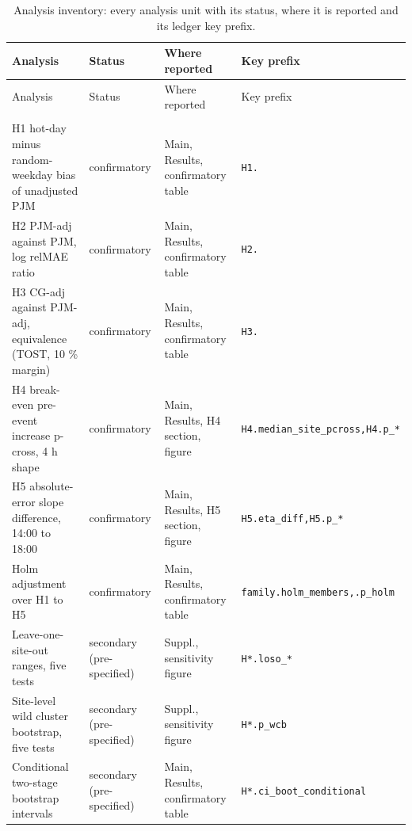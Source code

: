 {\footnotesize
\setlength{\tabcolsep}{3pt}
\renewcommand{\arraystretch}{1.0}
\begin{longtable}{@{}>{\raggedright\arraybackslash}p{}>{\raggedright\arraybackslash}p{}>{\raggedright\arraybackslash}p{}>{\raggedright\arraybackslash}p{}@{}}
\caption{Analysis inventory: every analysis unit with its status, where it is reported and its ledger key prefix.}\label{tabS:inventory}\\
\toprule
Analysis & Status & Where reported & Key prefix \\
\midrule
\endfirsthead
\toprule
Analysis & Status & Where reported & Key prefix \\
\midrule
\endhead
\midrule \multicolumn{4}{r}{\emph{continued on the next page}} \\ \endfoot
\bottomrule \endlastfoot
H1 hot-day minus random-weekday bias of unadjusted PJM & confirmatory & Main, Results, confirmatory table & \texttt{H1.\allowbreak {*}} \\
H2 PJM-adj against PJM, log relMAE ratio & confirmatory & Main, Results, confirmatory table & \texttt{H2.\allowbreak {*}} \\
H3 CG-adj against PJM-adj, equivalence (TOST, 10 \% margin) & confirmatory & Main, Results, confirmatory table & \texttt{H3.\allowbreak {*}} \\
H4 break-even pre-event increase p-cross, 4 h shape & confirmatory & Main, Results, H4 section, figure & \texttt{H4.\allowbreak median\_site\_pcross,\allowbreak  H4.\allowbreak p\_{*}} \\
H5 absolute-error slope difference, 14:00 to 18:00 & confirmatory & Main, Results, H5 section, figure & \texttt{H5.\allowbreak eta\_diff,\allowbreak  H5.\allowbreak p\_{*}} \\
Holm adjustment over H1 to H5 & confirmatory & Main, Results, confirmatory table & \texttt{family.\allowbreak holm\_members,\allowbreak  {*}.\allowbreak p\_holm} \\
Leave-one-site-out ranges, five tests & secondary (pre-specified) & Suppl., sensitivity figure & \texttt{H{*}.\allowbreak loso\_{*}} \\
Site-level wild cluster bootstrap, five tests & secondary (pre-specified) & Suppl., sensitivity figure & \texttt{H{*}.\allowbreak p\_wcb} \\
Conditional two-stage bootstrap intervals & secondary (pre-specified) & Main, Results, confirmatory table & \texttt{H{*}.\allowbreak ci\_boot\_conditional} \\

\end{longtable}}
